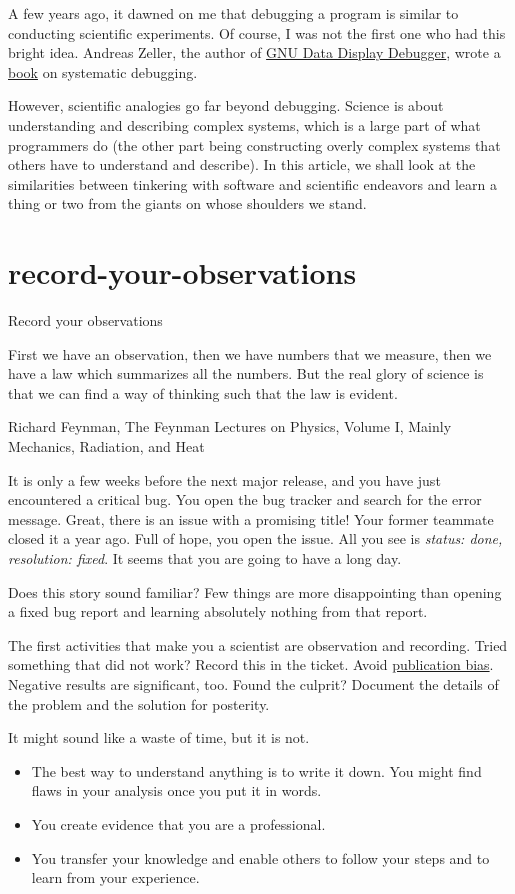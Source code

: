 \documentclass{article}
\begin{document}
A few years ago, it dawned on me that debugging a program is similar to conducting scientific experiments.
Of course, I was not the first one who had this bright idea.
Andreas Zeller, the author of \href{https://www.gnu.org/software/ddd/ddd.html}{GNU Data Display Debugger}, wrote a \href{https://www.whyprogramsfail.com/}{book} on systematic debugging.

However, scientific analogies go far beyond debugging.
Science is about understanding and describing complex systems, which is a large part of what programmers do (the other part being constructing overly complex systems that others have to understand and describe).
In this article, we shall look at the similarities between tinkering with software and scientific endeavors and learn a thing or two from the giants on whose shoulders we stand.

\section{record-your-observations}{Record your observations}
\epigraph{
  First we have an observation, then we have numbers that we measure, then we have a law which summarizes all the numbers.
  But the real glory of science is that we can find a way of thinking such that the law is evident.
}{Richard Feynman, The Feynman Lectures on Physics, Volume I, Mainly Mechanics, Radiation, and Heat}

It is only a few weeks before the next major release, and you have just encountered a critical bug.
You open the bug tracker and search for the error message.
Great, there is an issue with a promising title!
Your former teammate closed it a year ago.
Full of hope, you open the issue.
All you see is \emph{status: done, resolution: fixed}.
It seems that you are going to have a long day.

Does this story sound familiar?
Few things are more disappointing than opening a fixed bug report and learning absolutely nothing from that report.

The first activities that make you a scientist are observation and recording.
Tried something that did not work?
Record this in the ticket.
Avoid \href{https://en.wikipedia.org/wiki/Publication_bias}{publication bias}.
Negative results are significant, too.
Found the culprit?
Document the details of the problem and the solution for posterity.

It might sound like a waste of time, but it is not.

\begin{itemize}
  \item 
    The best way to understand anything is to write it down.
    You might find flaws in your analysis once you put it in words.
  \item You create evidence that you are a professional.
  \item You transfer your knowledge and enable others to follow your steps and to learn from your experience.
\end{itemize}
\end{document}
